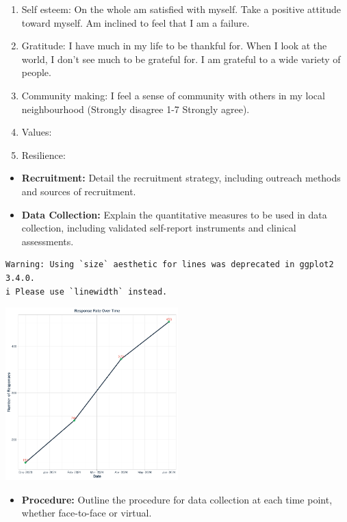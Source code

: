 \documentclass[
  man,
  longtable,
  nolmodern,
  notxfonts,
  notimes,
  colorlinks=true,linkcolor=blue,citecolor=blue,urlcolor=blue]{apa7}
\providecommand{\tightlist}{%
  \setlength{\itemsep}{0pt}\setlength{\parskip}{0pt}}
\begin{document}
\begin{enumerate}
\def\labelenumi{\arabic{enumi}.}
\setcounter{enumi}{6}
\tightlist
\item
  Self esteem: On the whole am satisfied with myself. Take a positive
  attitude toward myself. Am inclined to feel that I am a failure.
\item
  Gratitude: I have much in my life to be thankful for. When I look at
  the world, I don't see much to be grateful for. I am grateful to a
  wide variety of people.
\item
  Community making: I feel a sense of community with others in my local
  neighbourhood (Strongly disagree 1-7 Strongly agree).
\item
  Values:
\item
  Resilience:
\end{enumerate}

\begin{itemize}
\item
  \textbf{Recruitment:} Detail the recruitment strategy, including
  outreach methods and sources of recruitment.
\item
  \textbf{Data Collection:} Explain the quantitative measures to be used
  in data collection, including validated self-report instruments and
  clinical assessments.
\end{itemize}

\begin{verbatim}
Warning: Using `size` aesthetic for lines was deprecated in ggplot2 3.4.0.
i Please use `linewidth` instead.
\end{verbatim}

\includegraphics[width=0.5\textwidth,height=\textheight]{protocol_APA_files/figure-pdf/unnamed-chunk-6-1.pdf}

\begin{itemize}
\tightlist
\item
  \textbf{Procedure:} Outline the procedure for data collection at each
  time point, whether face-to-face or virtual.
\end{itemize}
\end{document}
